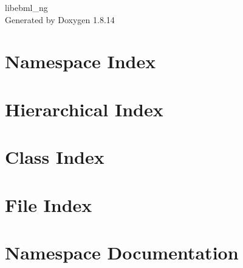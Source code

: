 \documentclass[twoside]{book}
\newcommand{\+}{\discretionary{\mbox{\scriptsize$\hookleftarrow$}}{}{}}
\newcommand{\clearemptydoublepage}{%
  \newpage{\pagestyle{empty}\cleardoublepage}%
}
\begin{document}
\hypersetup{pageanchor=false,
             bookmarksnumbered=true,
             pdfencoding=unicode
            }
\begin{titlepage}
\vspace*{7cm}
\begin{center}%
{\Large libebml\+\_\+ng }\\
\vspace*{1cm}
{\large Generated by Doxygen 1.8.14}\\
\end{center}
\end{titlepage}
\clearemptydoublepage
{}
\tableofcontents
\clearemptydoublepage
{}
\hypersetup{pageanchor=true}

\chapter{Namespace Index}

\chapter{Hierarchical Index}

\chapter{Class Index}

\chapter{File Index}

\chapter{Namespace Documentation}

\end{document}
